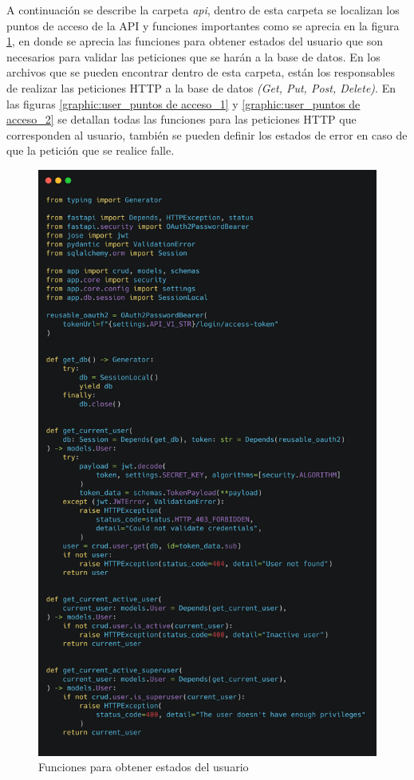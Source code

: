 A continuación se describe la carpeta \textit{api}, dentro de esta carpeta se localizan los puntos de acceso de la API y funciones importantes como se aprecia en la figura \ref{graphic:deps}, en donde se aprecia las funciones para obtener estados del usuario que son necesarios para validar las peticiones que se harán a la base de datos. En los archivos que se pueden encontrar dentro de esta carpeta, están los responsables de realizar las peticiones HTTP a la base de datos \textit{(Get, Put, Post, Delete)}. En las figuras \ref{graphic:user_puntos de acceso_1} y \ref{graphic:user_puntos de acceso_2} se detallan todas las funciones para las peticiones HTTP que corresponden al usuario, también se pueden definir los estados de error en caso de que la petición que se realice falle.

\begin{figure}[!htb]
    \centering
    \includegraphics[scale=.10]{TT/img/implementacion/deps.png}
    \caption{Funciones para obtener estados del usuario}
    \label{graphic:deps}    
\end{figure}


